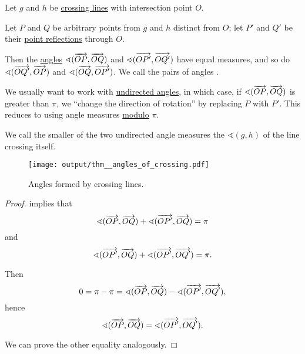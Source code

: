 \begin{proposition}\label{thm:angles_of_crossing}
  Let \( g \) and \( h \) be \hyperref[def:crossing_lines]{crossing lines} with intersection point \( O \).

  Let \( P \) and \( Q \) be arbitrary points from \( g \) and \( h \) distinct from \( O \); let \( P' \) and \( Q' \) be their \hyperref[def:rigid_motion/point_reflection]{point reflections} through \( O \).

  Then the \hyperref[def:angle]{angles} \( \sphericalangle(\overrightarrow{OP}, \overrightarrow{OQ}) \) and \( \sphericalangle(\overrightarrow{OP'}, \overrightarrow{OQ'}) \) have equal measures, and so do \( \sphericalangle(\overrightarrow{OQ'}, \overrightarrow{OP}) \) and \( \sphericalangle(\overrightarrow{OQ}, \overrightarrow{OP'}) \). We call the pairs of angles .

  We usually want to work with \hyperref[def:angle/undirected]{undirected angles}, in which case, if \( \sphericalangle(\overrightarrow{OP}, \overrightarrow{OQ}) \) is greater than \( \pi \), we \enquote{change the direction of rotation} by replacing \( P \) with \( P' \). This reduces to using angle measures \hyperref[rem:congruence_modulo_real_number]{modulo} \( \pi \).

  We call the smaller of the two undirected angle measures the  \( \sphericalangle(g, h) \) of the line crossing itself.

  \begin{figure}[!ht]
    \centering
    \texttt{[image: output/thm\_\_angles\_of\_crossing.pdf]}
    \caption{Angles formed by crossing lines.}\label{fig:thm:angles_of_crossing}
  \end{figure}
\end{proposition}
\begin{proof}
   implies that
  \begin{equation*}
    \sphericalangle(\overrightarrow{OP}, \overrightarrow{OQ}) + \sphericalangle(\overrightarrow{OP'}, \overrightarrow{OQ}) = \pi
  \end{equation*}
  and
  \begin{equation*}
    \sphericalangle(\overrightarrow{OP'}, \overrightarrow{OQ}) + \sphericalangle(\overrightarrow{OP'}, \overrightarrow{OQ'}) = \pi.
  \end{equation*}

  Then
  \begin{equation*}
    0 = \pi - \pi = \sphericalangle(\overrightarrow{OP}, \overrightarrow{OQ}) - \sphericalangle(\overrightarrow{OP'}, \overrightarrow{OQ'}),
  \end{equation*}
  hence
  \begin{equation*}
    \sphericalangle(\overrightarrow{OP}, \overrightarrow{OQ}) = \sphericalangle(\overrightarrow{OP'}, \overrightarrow{OQ'}).
  \end{equation*}

  We can prove the other equality analogously.
\end{proof}

